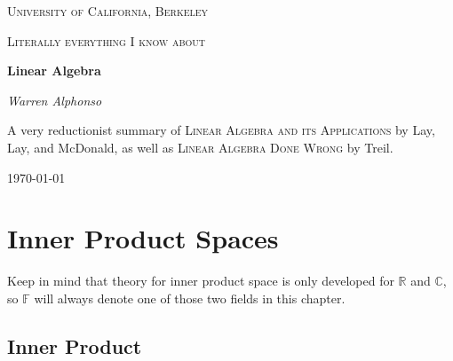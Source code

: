 \documentclass[a4paper,10pt]{book}
\theoremstyle{plain}
\theoremstyle{plain}
\theoremstyle{remark}
\theoremstyle{definition}
\begin{document}
\frontmatter 
{\let\cleardoublepage\clearpage 
\begin{titlepage}
	\centering
	{\scshape\LARGE University of California, Berkeley \par}
	\vspace{3cm}
	{\scshape\Large Literally everything I know about \par}
	\vspace{1.5cm}
	{\huge\bfseries Linear Algebra\par}
	\vspace{2.5cm}
	{\Large\itshape Warren Alphonso\par}
	\vfill
	{\large A very reductionist summary of \textsc{Linear Algebra and its Applications} by Lay, Lay, and McDonald, as well as \textsc{Linear Algebra Done Wrong} by Treil. \par}
	\vfill
	{\large \today\par}
\end{titlepage}

\tableofcontents
}

\mainmatter



















\chapter{Inner Product Spaces}

Keep in mind that theory for inner product space is only developed for $\mathbb{R}$ and $\mathbb{C}$, so $\mathbb{F}$ will always denote one of those two fields in this chapter. 

\section{Inner Product}
\end{document}
